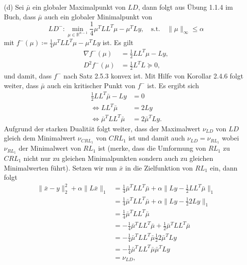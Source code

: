 \documentclass[ngerman, a4paper,12pt]{article}
\begin{document}
\par
(d) Sei $\bar{\mu}$ ein globaler Maximalpunkt von $LD$, dann folgt aus Übung 1.1.4 im Buch, dass $\bar{\mu}$ auch ein globaler Minimalpunkt von
\begin{equation*}
	LD^-: \min_{\mu \in \mathbb{R}^{n-1}} \frac{1}{4}\mu^TLL^T\mu - \mu^TLy, \quad \text{s.t.} \quad \|\mu \|_{\infty}\leq \alpha 
\end{equation*}
mit $f^-(\mu) \coloneqq \frac{1}{4}\mu^TLL^T\mu - \mu^TLy$ ist. Es gilt
\begin{equation*}
	\begin{split}
		\nabla f^-(\mu) &= \frac{1}{2} LL^T\mu - Ly, \\
		D^2f^-(\mu) &= \frac{1}{2} L^TL \succeq 0,
	\end{split}
\end{equation*}
und damit, dass $f^-$ nach Satz 2.5.3 konvex ist. Mit Hilfe von Korollar 2.4.6 folgt weiter, dass $\bar{\mu}$ auch ein kritischer Punkt von $f^-$ ist. Es ergibt sich
\begin{equation}
\label{eq:22d}
	\begin{split}
			\frac{1}{2}LL^T \bar{\mu} - Ly&=0 \\
			\Leftrightarrow LL^T \bar{\mu} &= 2Ly \\
			\Leftrightarrow \bar{\mu}^T LL^T \bar{\mu} &= 2\bar{\mu}^TLy.
	\end{split}
\end{equation}
Aufgrund der starken Dualität folgt weiter, dass der Maximalwert $\nu_{LD}$ von $LD$ gleich dem Minimalwert $\nu_{CRL_1}$ von $CRL_1$ ist und damit auch $\nu_{LD}=\nu_{RL_1}$ wobei $\nu_{RL_1}$ der Minimalwert von $RL_1$ ist (merke, dass die Umformung von $RL_1$ zu $CRL_1$ nicht nur zu gleichen Minimalpunkten sondern auch zu gleichen Minimalwerten führt). Setzen wir nun $\bar{x}$ in die Zielfunktion von $RL_1$ ein, dann folgt
\begin{equation*}
	\begin{split}
		\|\bar{x} - y\|_2^2 + \alpha \| L\bar{x}\|_1 &= \frac{1}{4}\bar{\mu}^TLL^T\bar{\mu} + \alpha \|Ly - \frac{1}{2}LL^T\bar{\mu} \|_1 \\
		&=  \frac{1}{4}\bar{\mu}^TLL^T\bar{\mu} + \alpha \|Ly - \frac{1}{2}2Ly \|_1 \\
		&= \frac{1}{4}\bar{\mu}^TLL^T\bar{\mu} \\
		&= -\frac{1}{4}\bar{\mu}^TLL^T\bar{\mu} + \frac{1}{2}\bar{\mu}^TLL^T\bar{\mu}\\
		&= -\frac{1}{4}\bar{\mu}^TLL^T\bar{\mu} \frac{1}{2} 2\bar{\mu}^TLy\\
		&= -\frac{1}{4}\bar{\mu}^TLL^T\bar{\mu} \bar{\mu}^TLy \\
		&= \nu_{LD},
	\end{split}
\end{equation*}
\end{document}
